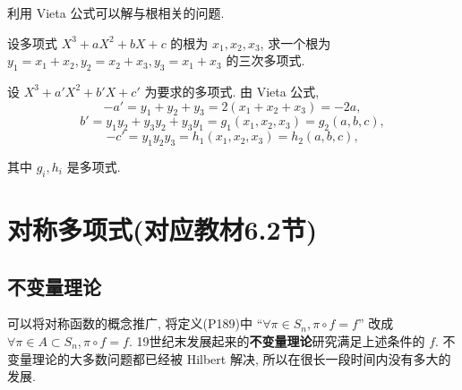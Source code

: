 \documentclass[color=black,device=normal,lang=cn,mode=geye]{elegantnote}
\begin{document}
利用 Vieta 公式可以解与根相关的问题.
\begin{example}
    设多项式 $X^3+aX^2+bX+c$ 的根为 $x_1,x_2,x_3$, 求一个根为 $y_1=x_1+x_2,y_2=x_2+x_3,y_3=x_1+x_3$ 的三次多项式.
\end{example}
\begin{solution}
    设 $X^3+a'X^2+b'X+c'$ 为要求的多项式. 由 Vieta 公式,
    \[-a'=y_1+y_2+y_3=2(x_1+x_2+x_3)=-2a,\]
    \[b'=y_1y_2+y_3y_2+y_3y_1=g_1(x_1,x_2,x_3)=g_2(a,b,c),\]
    \[-c'=y_1y_2y_3=h_1(x_1,x_2,x_3)=h_2(a,b,c),\]

    其中 $g_i,h_i$ 是多项式.
\end{solution}
\section{对称多项式(对应教材6.2节)}
\subsection{不变量理论}
可以将对称函数的概念推广, 将定义(P189)中 ``$\forall\pi\in S_n,\pi\circ f=f$'' 改成 $\forall\pi\in A\subset S_n,\pi\circ f=f$. 19世纪末发展起来的\textbf{不变量理论}研究满足上述条件的 $f$. 不变量理论的大多数问题都已经被 Hilbert 解决, 所以在很长一段时间内没有多大的发展.
\end{document}
